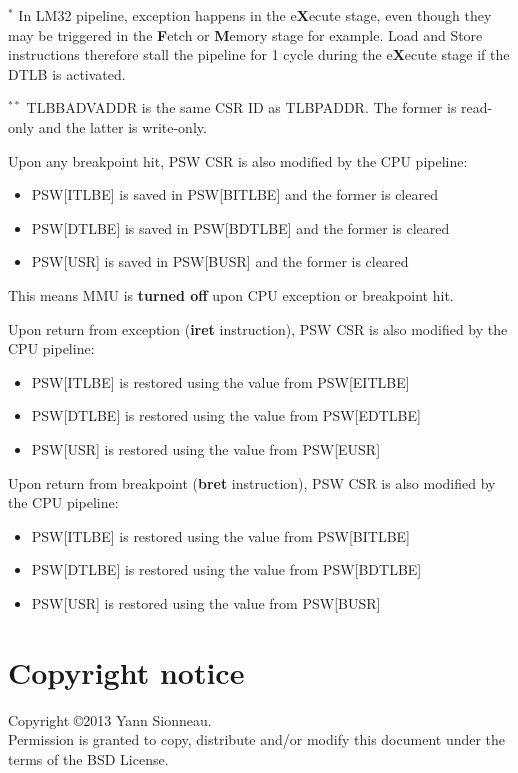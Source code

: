 \documentclass[a4paper,11pt]{article}
\begin{document}
$^{*}$ In LM32 pipeline, exception happens in the e\textbf{X}ecute stage, even though they may be triggered in the \textbf{F}etch or \textbf{M}emory stage for example. Load and Store instructions therefore stall the pipeline for 1 cycle during the e\textbf{X}ecute stage if the DTLB is activated.

$^{**}$ TLBBADVADDR is the same CSR ID as TLBPADDR. The former is read-only and the latter is write-only.

Upon any breakpoint hit, PSW CSR is also modified by the CPU pipeline:

\begin{itemize}
	\item PSW[ITLBE] is saved in PSW[BITLBE] and the former is cleared
	\item PSW[DTLBE] is saved in PSW[BDTLBE] and the former is cleared
	\item PSW[USR] is saved in PSW[BUSR] and the former is cleared
\end{itemize}

This means MMU is \textbf{turned off} upon CPU exception or breakpoint hit.

Upon return from exception (\textbf{iret} instruction), PSW CSR is also modified by the CPU pipeline:

\begin{itemize}
	\item PSW[ITLBE] is restored using the value from PSW[EITLBE]
	\item PSW[DTLBE] is restored using the value from PSW[EDTLBE]
	\item PSW[USR] is restored using the value from PSW[EUSR]
\end{itemize}

Upon return from breakpoint (\textbf{bret} instruction), PSW CSR is also modified by the CPU pipeline:

\begin{itemize}
	\item PSW[ITLBE] is restored using the value from PSW[BITLBE]
	\item PSW[DTLBE] is restored using the value from PSW[BDTLBE]
	\item PSW[USR] is restored using the value from PSW[BUSR]
\end{itemize}

\section*{Copyright notice}
Copyright \copyright 2013 Yann Sionneau. \\
Permission is granted to copy, distribute and/or modify this document under the terms of the BSD License.
\end{document}
